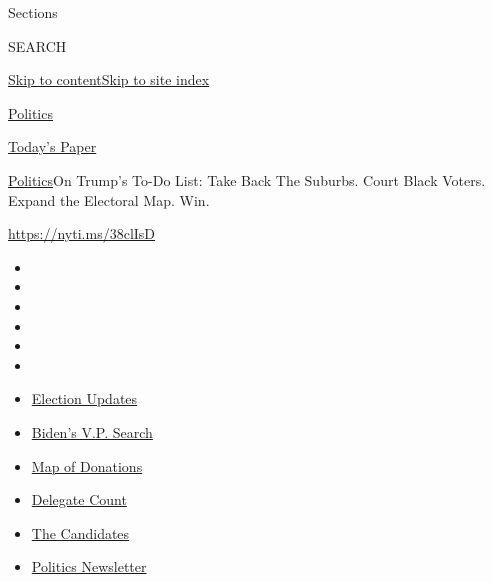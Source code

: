 Sections

SEARCH

\protect\hyperlink{site-content}{Skip to
content}\protect\hyperlink{site-index}{Skip to site index}

\href{https://www.nytimes.com/section/politics}{Politics}

\href{https://myaccount.nytimes.com/auth/login?response_type=cookie\&client_id=vi}{}

\href{https://www.nytimes.com/section/todayspaper}{Today's Paper}

\href{/section/politics}{Politics}\textbar{}On Trump's To-Do List: Take
Back The Suburbs. Court Black Voters. Expand the Electoral Map. Win.

\url{https://nyti.ms/38clIsD}

\begin{itemize}
\item
\item
\item
\item
\item
\item
\end{itemize}

\begin{itemize}
\item
  \href{https://www.nytimes.com/2020/07/31/us/elections/biden-vs-trump.html?action=click\&pgtype=Article\&state=default\&region=TOP_BANNER\&context=storylines_menu}{Election
  Updates}
\item
  \href{https://www.nytimes.com/article/biden-vice-president-2020.html?action=click\&pgtype=Article\&state=default\&region=TOP_BANNER\&context=storylines_menu}{Biden's
  V.P. Search}
\item
  \href{https://www.nytimes.com/interactive/2020/07/24/us/politics/trump-biden-campaign-donors.html?action=click\&pgtype=Article\&state=default\&region=TOP_BANNER\&context=storylines_menu}{Map
  of Donations}
\item
  \href{https://www.nytimes.com/interactive/2020/us/elections/delegate-count-primary-results.html?action=click\&pgtype=Article\&state=default\&region=TOP_BANNER\&context=storylines_menu}{Delegate
  Count}
\item
  \href{https://www.nytimes.com/interactive/2019/us/politics/2020-presidential-candidates.html?action=click\&pgtype=Article\&state=default\&region=TOP_BANNER\&context=storylines_menu}{The
  Candidates}
\item
  \href{https://www.nytimes.com/newsletters/politics?action=click\&pgtype=Article\&state=default\&region=TOP_BANNER\&context=storylines_menu}{Politics
  Newsletter}
\end{itemize}


